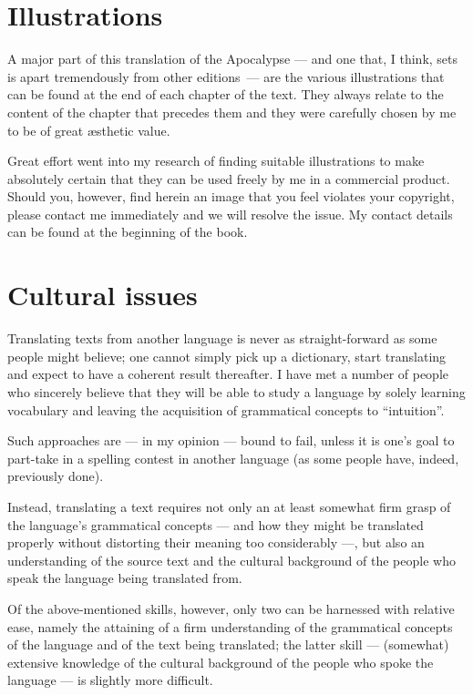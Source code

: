 \section*{Illustrations}
  
A major part of this translation of the Apocalypse — and one that, I think, sets is apart tremendously from other editions — are the various illustrations that can be found at the end of each chapter of the text. They always relate to the content of the chapter that precedes them and they were carefully chosen by me to be of great \ae sthetic value.

Great effort went into my research of finding suitable illustrations to make absolutely certain that they can be used freely by me in a commercial product. Should you, however, find herein an image that you feel violates your copyright, please contact me immediately and we will resolve the issue. My contact details can be found at the beginning of the book.

\section*{Cultural issues}
  
 Translating texts from another language is never as straight-forward as some people might believe; one cannot simply pick up a dictionary, start translating and expect to have a coherent result thereafter. I have met a number of people who sincerely believe that they will be able to study a language by solely learning vocabulary and leaving the acquisition of grammatical concepts to ``intuition''. 
 
 Such approaches are — in my opinion — bound to fail, unless it is one's goal to part-take in a spelling contest in another language (as some people have, indeed, previously done). 
 
 Instead, translating a text requires not only an at least somewhat firm grasp of the language's grammatical concepts — and how they might be translated properly without distorting their meaning too considerably —, but also an understanding of the source text and the cultural background of the people who speak the language being translated from. 
 
 Of the above-mentioned skills, however, only two can be harnessed with relative ease, namely the attaining of a firm understanding of the grammatical concepts of the language and of the text being translated; the latter skill — (somewhat) extensive knowledge of the cultural background of the people who spoke the language — is slightly more difficult.
 
